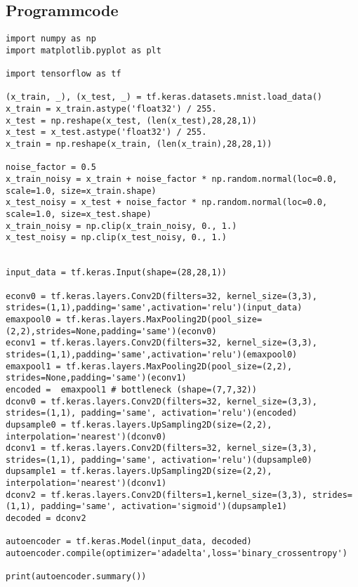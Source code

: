 
\begin{appendices}
\chapter{Programmcode}

\begin{verbatim}
import numpy as np
import matplotlib.pyplot as plt

import tensorflow as tf

(x_train, _), (x_test, _) = tf.keras.datasets.mnist.load_data()
x_train = x_train.astype('float32') / 255.
x_test = np.reshape(x_test, (len(x_test),28,28,1))
x_test = x_test.astype('float32') / 255.
x_train = np.reshape(x_train, (len(x_train),28,28,1))

noise_factor = 0.5
x_train_noisy = x_train + noise_factor * np.random.normal(loc=0.0, scale=1.0, size=x_train.shape)
x_test_noisy = x_test + noise_factor * np.random.normal(loc=0.0, scale=1.0, size=x_test.shape)
x_train_noisy = np.clip(x_train_noisy, 0., 1.)
x_test_noisy = np.clip(x_test_noisy, 0., 1.)


input_data = tf.keras.Input(shape=(28,28,1))

econv0 = tf.keras.layers.Conv2D(filters=32, kernel_size=(3,3), strides=(1,1),padding='same',activation='relu')(input_data)
emaxpool0 = tf.keras.layers.MaxPooling2D(pool_size=(2,2),strides=None,padding='same')(econv0)
econv1 = tf.keras.layers.Conv2D(filters=32, kernel_size=(3,3), strides=(1,1),padding='same',activation='relu')(emaxpool0)
emaxpool1 = tf.keras.layers.MaxPooling2D(pool_size=(2,2), strides=None,padding='same')(econv1)
encoded =  emaxpool1 # bottleneck (shape=(7,7,32))
dconv0 = tf.keras.layers.Conv2D(filters=32, kernel_size=(3,3), strides=(1,1), padding='same', activation='relu')(encoded)
dupsample0 = tf.keras.layers.UpSampling2D(size=(2,2), interpolation='nearest')(dconv0)
dconv1 = tf.keras.layers.Conv2D(filters=32, kernel_size=(3,3), strides=(1,1), padding='same', activation='relu')(dupsample0)
dupsample1 = tf.keras.layers.UpSampling2D(size=(2,2), interpolation='nearest')(dconv1)
dconv2 = tf.keras.layers.Conv2D(filters=1,kernel_size=(3,3), strides=(1,1), padding='same', activation='sigmoid')(dupsample1)
decoded = dconv2

autoencoder = tf.keras.Model(input_data, decoded)
autoencoder.compile(optimizer='adadelta',loss='binary_crossentropy')

print(autoencoder.summary())



\end{verbatim}
\end{appendices}

